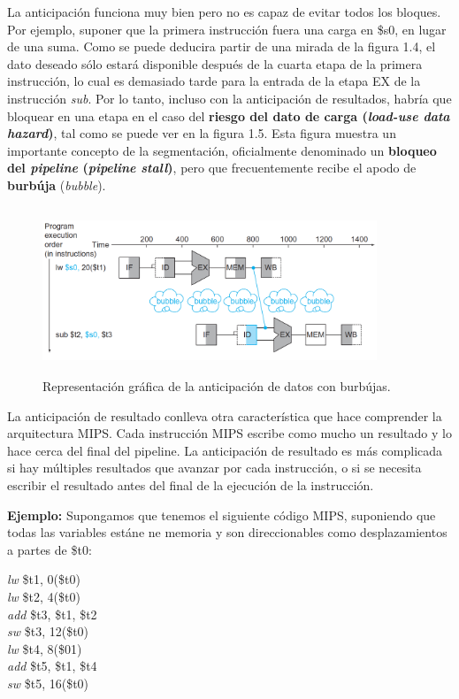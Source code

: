\documentclass[12pt,a4paper]{report}
\begin{document}
				\par La anticipación funciona muy bien pero no es capaz de evitar todos los bloques. Por ejemplo, suponer que la primera instrucción fuera una carga en \$s0, en lugar de una suma. Como se puede deducira partir de una mirada de la figura 1.4, el dato deseado sólo estará disponible después de la cuarta etapa de la primera instrucción, lo cual es demasiado tarde para la entrada de la etapa EX de la instrucción \textit{sub}. Por lo tanto, incluso con la anticipación de resultados, habría que bloquear en una etapa en el caso del \textbf{riesgo del dato de carga (\textit{load-use data hazard})}, tal como se puede ver en la figura 1.5. Esta figura muestra un importante concepto de la segmentación, oficialmente denominado un \textbf{bloqueo del \textit{pipeline} (\textit{pipeline stall})}, pero que frecuentemente recibe el apodo de \textbf{burbúja} (\textit{bubble}).

				\begin{figure}[htb]
					\centering
					\includegraphics[width=10cm, height=5cm]{./imagenes/bubble.png}
					\caption{Representación gráfica de la anticipación de datos con burbújas.}
				\end{figure}

				\par La anticipación de resultado conlleva otra característica que hace comprender la arquitectura MIPS. Cada instrucción MIPS escribe como mucho un resultado y lo hace cerca del final del pipeline. La anticipación de resultado es más complicada si hay múltiples resultados que avanzar por cada instrucción, o si se necesita escribir el resultado antes del final de la ejecución de la instrucción.

				\par \textbf{Ejemplo:} Supongamos que tenemos el siguiente código MIPS, suponiendo que todas las variables estáne ne memoria y son direccionables como desplazamientos a partes de \$t0:
				\begin{center}
					\textit{lw} \qquad \$t1, 0(\$t0) \\
					\textit{lw} \qquad \$t2, 4(\$t0) \\
					\textit{add} \qquad \$t3, \$t1, \$t2 \\
					\textit{sw} \qquad \$t3, 12(\$t0) \\
					\textit{lw} \qquad \$t4, 8(\$01) \\
					\textit{add} \qquad \$t5, \$t1, \$t4 \\
					\textit{sw} \qquad \$t5, 16(\$t0)
				\end{center}
\end{document}
